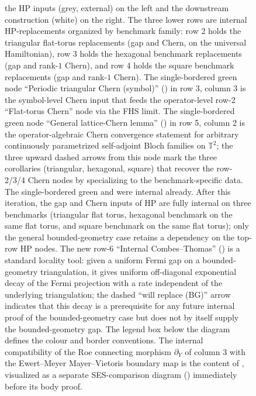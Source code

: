 \documentclass[11pt]{article}
\numberwithin{equation}{section}
\theoremstyle{definition}
\theoremstyle{remark}
\begin{document}
\begin{figure}[H]
{the HP inputs (grey, external) on the left and the downstream construction (white) on the
right. The three lower rows are internal HP-replacements organized by benchmark family: row 2
holds the triangular flat-torus replacements (gap and Chern, on the universal Hamiltonian),
row 3 holds the hexagonal benchmark replacements (gap and rank-\(1\) Chern), and row 4 holds
the square benchmark replacements (gap and rank-\(1\) Chern). The single-bordered green node
``Periodic triangular Chern (symbol)'' () in row 3,
column 3 is the symbol-level Chern input that feeds the operator-level row-2 ``Flat-torus
Chern'' node via the FHS limit. The single-bordered green node ``General lattice-Chern lemma''
() in row 5, column 2 is the operator-algebraic Chern
convergence statement for arbitrary continuously parametrized self-adjoint Bloch families on
\(\mathbb T^2\); the three upward dashed arrows from this node mark the three corollaries
(triangular, hexagonal, square) that recover the row-2/3/4 Chern nodes by specializing to the
benchmark-specific data. The single-bordered green
 and  were internal already.
After this iteration, the gap and Chern inputs of HP are fully internal on three benchmarks
(triangular flat torus, hexagonal benchmark on the same flat torus, and square benchmark on
the same flat torus); only the general bounded-geometry case retains a dependency on the
top-row HP nodes. The new row-6 ``Internal Combes--Thomas''
() is a standard locality tool: given a uniform Fermi gap
on a bounded-geometry triangulation, it gives uniform off-diagonal exponential decay of the
Fermi projection with a rate independent of the underlying triangulation; the dashed
``will replace (BG)'' arrow indicates that this decay is a prerequisite for any future
internal proof of the bounded-geometry case but does not by itself supply the bounded-geometry
gap. The legend box below the diagram defines the colour and border
conventions. The internal compatibility of the Roe connecting morphism \(\partial_Y\) of
column 3 with the Ewert--Meyer Mayer--Vietoris boundary map is the content of
, visualized as a separate SES-comparison diagram
() immediately before its body proof.}
\label{fig:hp_dependency_diagram}
\end{figure}
\end{document}
